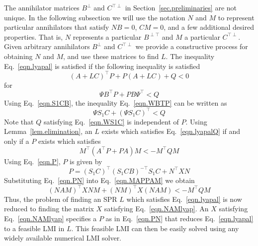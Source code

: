 \documentclass[]{../sty/JGCD}
\theoremstyle{examplestyle}
\begin{document}
  The annihilator matrices $B^{\perp}$ and $C^{\top\perp}$ in Section~\ref{sec.preliminaries} are not unique.
  In the following subsection we will use the notation $N$ and $M$ to represent particular annihilators that satisfy $NB=0$, $CM=0$, and a few additional desired properties.
  That is, $N$ represents a particular $B^{\perp\top}$ and $M$ a particular $C^{\top\perp}$.
  Given arbitrary annihilators $B^{\perp}$ and $C^{\top\perp}$ we provide a constructive process for obtaining $N$ and $M$, and use these matrices to find $L$.
  The inequality Eq.\ \eqref{eqn.lyapal} is satisfied if the following inequality is satisfied
  \begin{equation}
    \label{eqn.lyapalQ}
    (A+LC)^{\top}P+P(A+LC)+Q<0
  \end{equation}
  for
  \begin{equation}
    \label{eqn.WBTP}
    \Psi B^{\top}P+PB\Psi^{\top}<Q
  \end{equation}
  Using Eq.\ \eqref{eqn.S1CB}, the inequality Eq.\ \eqref{eqn.WBTP} can be written as
  \begin{equation}
    \label{eqn.WS1C}
    \Psi S_{1}C+(\Psi S_{1}C)^{\top}<Q
  \end{equation}
  Note that $Q$ satisfying Eq.\ \eqref{eqn.WS1C} is independent of $P$. Using Lemma~\ref{lem.elimination}, an $L$ exists which satisfies Eq.\ \eqref{eqn.lyapalQ} if and only if a $P$ exists which satisfies
  \begin{equation}
    \label{eqn.MAPPAM}
    M^{\top}(A^{\top}P+PA)M<-M^{\top}QM
  \end{equation}
  Using Eq.\ \eqref{eqn.P}, $P$ is given by
  \begin{equation}
    \label{eqn.PN}
    P=(S_{1}C)^{\top}(S_{1}CB)^{-\top}S_{1}C+N^{\top}XN
  \end{equation}
  Substituting Eq.\ \eqref{eqn.PN} into Eq.\ \eqref{eqn.MAPPAM} we obtain
  \begin{equation}
    \label{eqn.NAMlyap}
    (NAM)^{\top}XNM+(NM)^{\top}X(NAM)<-M^{\top}QM
  \end{equation}
  Thus, the problem of finding an SPR $L$ which satisfies Eq.\ \eqref{eqn.lyapal} is now reduced to finding the matrix $X$ satisfying Eq.\ \eqref{eqn.NAMlyap}.
  An $X$ satisfying Eq.\ \eqref{eqn.NAMlyap} specifies a $P$ as in Eq.\ \eqref{eqn.PN} that reduces Eq.\ \eqref{eqn.lyapal} to a feasible LMI in $L$.
  This feasible LMI can then be easily solved using any widely available numerical LMI solver.
\end{document}
